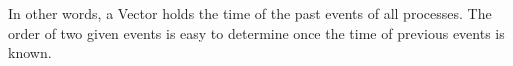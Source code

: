 In other words, a Vector holds the time of the past events of all processes. The order of two given events is easy to determine once the time of previous events is known. \\
  
\begin{comment}

JGroups is build as an IP multicast application using a transport protocol ( UDP TCP, or JMS (Java Message Service)) 
and, crucially,  it delivers reliability and ordering to group membership. Among other things this includes:\\

\pagebreak

\captionof{table}{JGroup properties } \label{tab:title}
\begin{tabular}{L{4.45in} }    %
\toprule[1.5pt] %

Lossless transmission of a message to all recipients (with retransmission of missing messages.) \\\midrule
Fragmentation of large messages into smaller ones and reassembly at the receiver's side\\\midrule
Ordering of messages, e.g. messages m1 and m2 sent by P will be received by all receivers in the same order, and not as m2, m1 (FIFO order)\\\midrule
Atomicity: a message will be received by all receivers, or none of them.\\\midrule
Knowledge of who the members of a group are. \\\midrule
Notification when a new member joins, an existing member leaves, or an existing member has crashed.\\

\bottomrule[1.25pt] %
\end {tabular}\par
\bigskip



JGroups consists of 3 main parts: (1) the Channel used by developers to build reliable group communication applications, (2) the building blocks which are layered on top of the channel and provide a higher abstraction level and (3) the protocol stack, which implements the properties specified for a given channel.\\

JGroups is highly configurable and developers can put together a protocol stack that suits their particular needs ranging from fast but unreliable to slower but reliable protocol stacks. i.e., a system might be composed, depending on the protocol stacks used, in such a way that it offers lossless transmission but not ordering of messages or lossless transmission, atomicity and ordering of messages etc.\\


\end{comment}

